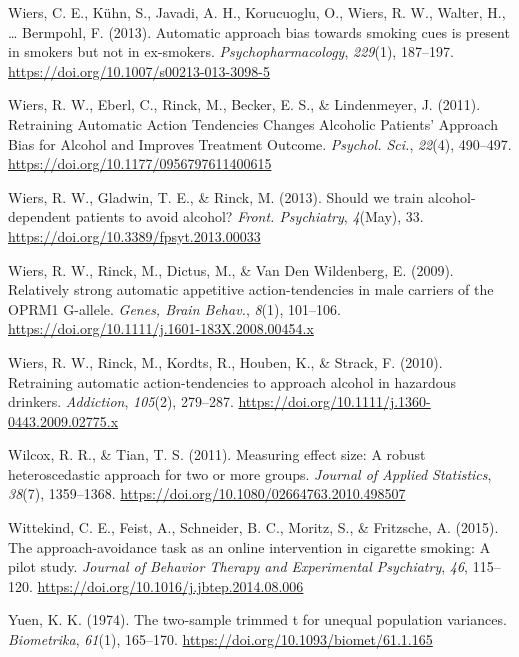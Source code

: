 \documentclass[man,floatsintext]{apa6}
\begin{document}
\leavevmode\hypertarget{ref-wiers_automatic_2013}{}%
Wiers, C. E., Kühn, S., Javadi, A. H., Korucuoglu, O., Wiers, R. W., Walter, H., \ldots{} Bermpohl, F. (2013). Automatic approach bias towards smoking cues is present in smokers but not in ex-smokers. \emph{Psychopharmacology}, \emph{229}(1), 187--197. \url{https://doi.org/10.1007/s00213-013-3098-5}

\leavevmode\hypertarget{ref-wiers_retraining_2011}{}%
Wiers, R. W., Eberl, C., Rinck, M., Becker, E. S., \& Lindenmeyer, J. (2011). Retraining Automatic Action Tendencies Changes Alcoholic Patients' Approach Bias for Alcohol and Improves Treatment Outcome. \emph{Psychol. Sci.}, \emph{22}(4), 490--497. \url{https://doi.org/10.1177/0956797611400615}

\leavevmode\hypertarget{ref-wiers_should_2013}{}%
Wiers, R. W., Gladwin, T. E., \& Rinck, M. (2013). Should we train alcohol-dependent patients to avoid alcohol? \emph{Front. Psychiatry}, \emph{4}(May), 33. \url{https://doi.org/10.3389/fpsyt.2013.00033}

\leavevmode\hypertarget{ref-wiers_relatively_2009}{}%
Wiers, R. W., Rinck, M., Dictus, M., \& Van Den Wildenberg, E. (2009). Relatively strong automatic appetitive action-tendencies in male carriers of the OPRM1 G-allele. \emph{Genes, Brain Behav.}, \emph{8}(1), 101--106. \url{https://doi.org/10.1111/j.1601-183X.2008.00454.x}

\leavevmode\hypertarget{ref-wiers_retraining_2010}{}%
Wiers, R. W., Rinck, M., Kordts, R., Houben, K., \& Strack, F. (2010). Retraining automatic action-tendencies to approach alcohol in hazardous drinkers. \emph{Addiction}, \emph{105}(2), 279--287. \url{https://doi.org/10.1111/j.1360-0443.2009.02775.x}

\leavevmode\hypertarget{ref-wilcox_measuring_2011}{}%
Wilcox, R. R., \& Tian, T. S. (2011). Measuring effect size: A robust heteroscedastic approach for two or more groups. \emph{Journal of Applied Statistics}, \emph{38}(7), 1359--1368. \url{https://doi.org/10.1080/02664763.2010.498507}

\leavevmode\hypertarget{ref-wittekind_approach-avoidance_2015}{}%
Wittekind, C. E., Feist, A., Schneider, B. C., Moritz, S., \& Fritzsche, A. (2015). The approach-avoidance task as an online intervention in cigarette smoking: A pilot study. \emph{Journal of Behavior Therapy and Experimental Psychiatry}, \emph{46}, 115--120. \url{https://doi.org/10.1016/j.jbtep.2014.08.006}

\leavevmode\hypertarget{ref-yuen_two-sample_1974}{}%
Yuen, K. K. (1974). The two-sample trimmed t for unequal population variances. \emph{Biometrika}, \emph{61}(1), 165--170. \url{https://doi.org/10.1093/biomet/61.1.165}

\endgroup
\end{document}
